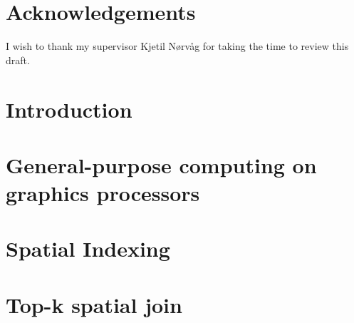 \documentclass[12pt]{report}
\begin{document}
\chapter*{Acknowledgements}
I wish to thank my supervisor Kjetil Nørvåg for taking the time to review this draft.

\tableofcontents

\chapter{Introduction}


\chapter{General-purpose computing on graphics processors}


\chapter{Spatial Indexing}


\chapter{Top-k spatial join}

%

%

\printbibliography{}
\end{document}
